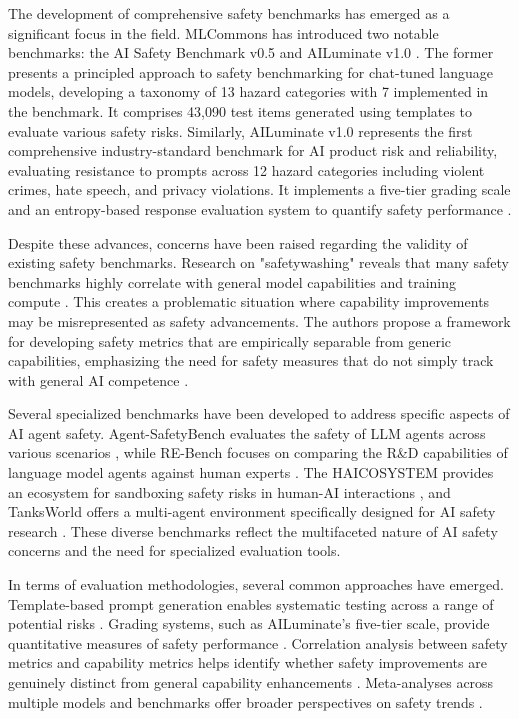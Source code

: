\documentclass[conference]{IEEEtran}
\begin{document}
The development of comprehensive safety benchmarks has emerged as a significant focus in the field. MLCommons has introduced two notable benchmarks: the AI Safety Benchmark v0.5 \cite{2404.12241} and AILuminate v1.0 \cite{2503.05731}. The former presents a principled approach to safety benchmarking for chat-tuned language models, developing a taxonomy of 13 hazard categories with 7 implemented in the benchmark. It comprises 43,090 test items generated using templates to evaluate various safety risks. Similarly, AILuminate v1.0 represents the first comprehensive industry-standard benchmark for AI product risk and reliability, evaluating resistance to prompts across 12 hazard categories including violent crimes, hate speech, and privacy violations. It implements a five-tier grading scale and an entropy-based response evaluation system to quantify safety performance \cite{2503.05731}.

Despite these advances, concerns have been raised regarding the validity of existing safety benchmarks. Research on "safetywashing" reveals that many safety benchmarks highly correlate with general model capabilities and training compute \cite{2407.21792}. This creates a problematic situation where capability improvements may be misrepresented as safety advancements. The authors propose a framework for developing safety metrics that are empirically separable from generic capabilities, emphasizing the need for safety measures that do not simply track with general AI competence \cite{2407.21792}.

Several specialized benchmarks have been developed to address specific aspects of AI agent safety. Agent-SafetyBench evaluates the safety of LLM agents across various scenarios \cite{2412.14470}, while RE-Bench focuses on comparing the R\&D capabilities of language model agents against human experts \cite{2411.15114}. The HAICOSYSTEM provides an ecosystem for sandboxing safety risks in human-AI interactions \cite{2409.16427}, and TanksWorld offers a multi-agent environment specifically designed for AI safety research \cite{2002.11174}. These diverse benchmarks reflect the multifaceted nature of AI safety concerns and the need for specialized evaluation tools.

In terms of evaluation methodologies, several common approaches have emerged. Template-based prompt generation enables systematic testing across a range of potential risks \cite{2404.12241, 2503.05731}. Grading systems, such as AILuminate's five-tier scale, provide quantitative measures of safety performance \cite{2503.05731}. Correlation analysis between safety metrics and capability metrics helps identify whether safety improvements are genuinely distinct from general capability enhancements \cite{2407.21792}. Meta-analyses across multiple models and benchmarks offer broader perspectives on safety trends \cite{2002.05671}.
\end{document}
